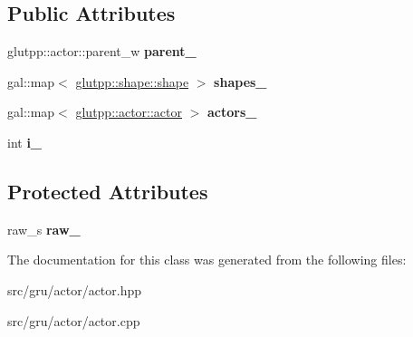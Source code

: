 \subsection*{\-Public \-Attributes}
\begin{DoxyCompactItemize}
\item 
\hypertarget{classglutpp_1_1actor_1_1actor_a61bec4248a775704061af93b0f7fe0a1}{glutpp\-::actor\-::parent\-\_\-w {\bfseries parent\-\_\-}}\label{classglutpp_1_1actor_1_1actor_a61bec4248a775704061af93b0f7fe0a1}

\item 
\hypertarget{classglutpp_1_1actor_1_1actor_a9a5ef977f6e7c9dcb56d7028178e5bdf}{gal\-::map$<$ \hyperlink{classglutpp_1_1shape_1_1shape}{glutpp\-::shape\-::shape} $>$ {\bfseries shapes\-\_\-}}\label{classglutpp_1_1actor_1_1actor_a9a5ef977f6e7c9dcb56d7028178e5bdf}

\item 
\hypertarget{classglutpp_1_1actor_1_1actor_aac9ce3b00b7c18812193142150fc45ae}{gal\-::map$<$ \hyperlink{classglutpp_1_1actor_1_1actor}{glutpp\-::actor\-::actor} $>$ {\bfseries actors\-\_\-}}\label{classglutpp_1_1actor_1_1actor_aac9ce3b00b7c18812193142150fc45ae}

\item 
\hypertarget{classglutpp_1_1actor_1_1actor_a0c5f47666b646e82100781432cad37d5}{int {\bfseries i\-\_\-}}\label{classglutpp_1_1actor_1_1actor_a0c5f47666b646e82100781432cad37d5}

\end{DoxyCompactItemize}
\subsection*{\-Protected \-Attributes}
\begin{DoxyCompactItemize}
\item 
\hypertarget{classglutpp_1_1actor_1_1actor_af81f6799ca5e385af58b4222ec69e20a}{raw\-\_\-s {\bfseries raw\-\_\-}}\label{classglutpp_1_1actor_1_1actor_af81f6799ca5e385af58b4222ec69e20a}

\end{DoxyCompactItemize}


\-The documentation for this class was generated from the following files\-:\begin{DoxyCompactItemize}
\item 
src/gru/actor/actor.\-hpp\item 
src/gru/actor/actor.\-cpp\end{DoxyCompactItemize}
